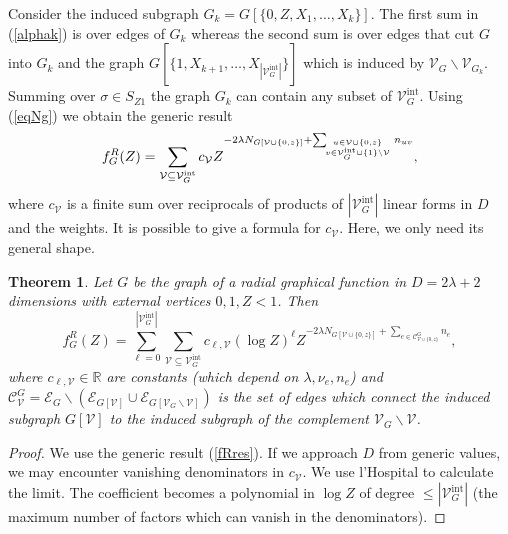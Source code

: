 \documentclass[oneside]{amsart}
\newcommand{\RR}{{\mathbb R}}
\newcommand{\sC}{\mathcal{C}}
\newcommand{\sE}{\mathcal{E}}
\newcommand{\sV}{\mathcal{V}}
\newcommand{\sVGint}{{\sV_G^\mathrm{int}}}
\newcommand{\VGint}{{|\sVGint|}}
\theoremstyle{plain}
\newtheorem{thm}{Theorem}
\begin{document}
Consider the induced subgraph $G_k=G[\{0,Z,X_1,\ldots,X_k\}]$. The first sum in (\ref{alphak}) is over edges of $G_k$ whereas the second sum is over edges that cut
$G$ into $G_k$ and the graph $G[\{1,X_{k+1},\ldots,X_\VGint\}]$ which is induced by $\sV_G\backslash\sV_{G_k}$.
Summing over $\sigma\in S_{Z1}$ the graph $G_k$ can contain any subset of $\sVGint$. Using (\ref{eqNg}) we obtain the generic result
\begin{equation}\label{fRres}
f_G^R(Z)=\sum_{\sV\subseteq\sVGint}c_\sV Z^{-2\lambda N_{G[\sV\cup\{0,z\}]}+\sum_{\!\!\genfrac{}{}{0pt}{}{u\in\sV\cup\{0,z\}}{v\in\sVGint\cup\{1\}\backslash\sV}}n_{uv}},
\end{equation}
where $c_\sV$ is a finite sum over reciprocals of products of $\VGint$ linear forms in $D$ and the weights. It is possible to give a formula for $c_\sV$. Here, we only need its general shape.

\begin{thm}\label{radialthm}
Let $G$ be the graph of a radial graphical function in $D=2\lambda+2$ dimensions with external vertices $0,1,Z<1$. Then
\begin{equation}\label{Req}
f_G^R(Z)=\sum_{\ell=0}^{\VGint}\sum_{\sV\subseteq\sVGint}c_{\ell,\sV}(\log Z)^\ell Z^{-2\lambda N_{G[\sV\cup\{0,z\}]}+\sum_{e\in\sC^G_{\sV\cup\{0,z\}}}n_e},
\end{equation}
where $c_{\ell,\sV}\in\RR$ are constants (which depend on $\lambda,\nu_e,n_e$) and $\sC^G_{\sV}=\sE_G\backslash(\sE_{G[\sV]}\cup\sE_{G[\sV_G\backslash\sV]})$ is the set of edges which connect
the induced subgraph $G[\sV]$ to the induced subgraph of the complement $\sV_G\backslash\sV$.
\end{thm}
\begin{proof}
We use the generic result (\ref{fRres}). If we approach $D$ from generic values, we may encounter vanishing denominators in $c_\sV$.
We use l'Hospital to calculate the limit. The coefficient becomes a polynomial in $\log Z$ of degree $\leq\VGint$ (the maximum number of factors which can vanish in the denominators).
\end{proof}
\end{document}

